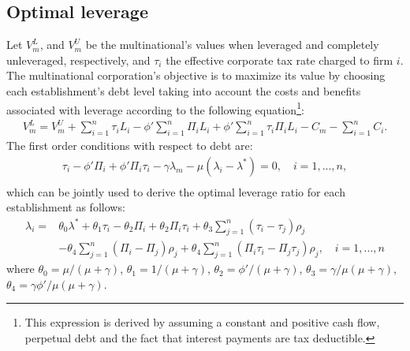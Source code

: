 \documentclass[12pt]{article}
\begin{document}
	\subsection{Optimal leverage}
	\label{subsec:opt_leverage}
	Let $V_m^L$, and $V_m^U$ be the multinational's values when leveraged and completely unleveraged, respectively, and $\tau_{i}$ the effective corporate tax rate charged to firm $i$. The multinational corporation's objective is to maximize its value by choosing each establishment's debt level taking into account the costs and benefits associated with leverage according to the following equation\footnote{This expression is derived by assuming a constant and positive cash flow, perpetual debt and the fact that interest payments are tax deductible.}:
	\begin{equation}
	\begin{aligned}
	V_m^L=V_m^U+\sum_{i=1}^{n}\tau_iL_i-\phi'\sum_{i=1}^{n}\Pi_iL_i+\phi'\sum_{i=1}^{n}\tau_i\Pi_i L_i-C_m-\sum_{i=1}^{n}C_i.
	\end{aligned}
	\label{eq:v_l}
	\end{equation}
    The first order conditions with respect to debt are:
	\begin{equation}
	\begin{aligned}
	\tau_i-\phi'\Pi_i+\phi'\Pi_i\tau_{i}-\gamma\lambda_m-\mu(\lambda_i-\lambda^*)=0, \quad i=1,...,n,\\
	\end{aligned}
	\label{eq:FOC}
	\end{equation}
	which can be jointly used to derive the optimal leverage ratio for each establishment as follows:
	\begin{equation}
	\begin{aligned}
	\lambda_i=&\theta_0\lambda^*+\theta_1\tau_i-\theta_2\Pi_i+\theta_2\Pi_i\tau_{i}
	+\theta_3\sum_{j=1}^{n}(\tau_i-\tau_j)\rho_j\\
	&-\theta_4\sum_{j=1}^{n}(\Pi_i-\Pi_j)\rho_j
	+\theta_4\sum_{j=1}^{n}(\Pi_i\tau_i-\Pi_j\tau_j)\rho_j, \quad i=1,...,n
	\end{aligned}
	\label{eq:optimal leverage in theory}
	\end{equation}
	where $ \theta_0=\mu/(\mu+\gamma)$, $\theta_1=1/(\mu+\gamma)$,
	$\theta_2=\phi'/(\mu+\gamma)$,
	$\theta_3=\gamma/\mu(\mu+\gamma)$,
	$\theta_4=\gamma\phi'/\mu(\mu+\gamma)$.
	
\end{document}
